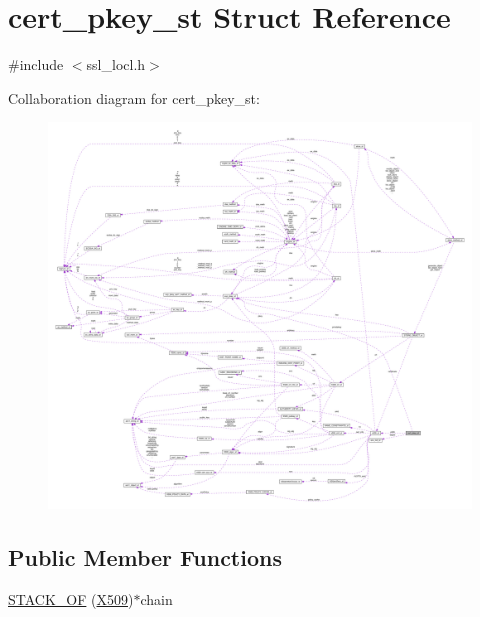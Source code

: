 \hypertarget{structcert__pkey__st}{}\section{cert\+\_\+pkey\+\_\+st Struct Reference}
\label{structcert__pkey__st}


{\ttfamily \#include $<$ssl\+\_\+locl.\+h$>$}



Collaboration diagram for cert\+\_\+pkey\+\_\+st\+:\nopagebreak
\begin{figure}[H]
\begin{center}
\leavevmode
\includegraphics[width=350pt]{structcert__pkey__st__coll__graph}
\end{center}
\end{figure}
\subsection*{Public Member Functions}
\begin{DoxyCompactItemize}
\item 
\hyperlink{structcert__pkey__st_a04c95f35f78e81827e34051ad378504e}{S\+T\+A\+C\+K\+\_\+\+OF} (\hyperlink{crypto_2ossl__typ_8h_a4f666bde6518f95deb3050c54b408416}{X509})$\ast$chain
\end{DoxyCompactItemize}

